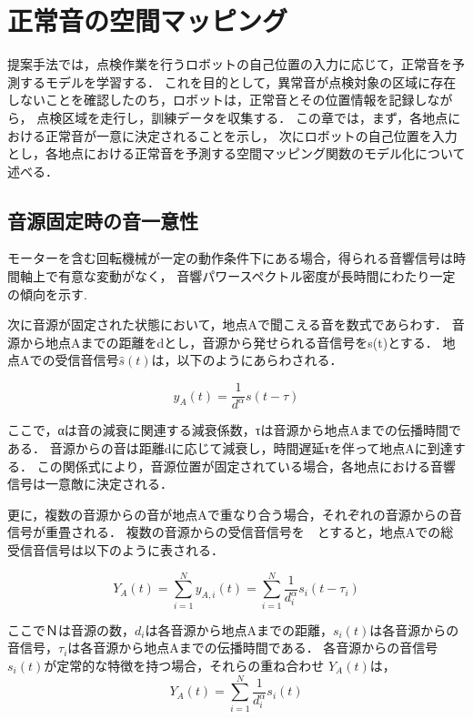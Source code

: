 \documentclass[../main]{subfiles}
\begin{document}
\section{正常音の空間マッピング}

提案手法では，点検作業を行うロボットの自己位置の入力に応じて，正常音を予測するモデルを学習する．
これを目的として，異常音が点検対象の区域に存在しないことを確認したのち，ロボットは，正常音とその位置情報を記録しながら，
点検区域を走行し，訓練データを収集する．
この章では，まず，各地点における正常音が一意に決定されることを示し，
次にロボットの自己位置を入力とし，各地点における正常音を予測する空間マッピング関数のモデル化について述べる．
\subsection{音源固定時の音一意性}

モーターを含む回転機械が一定の動作条件下にある場合，得られる音響信号は時間軸上で有意な変動がなく，
音響パワースペクトル密度が長時間にわたり一定の傾向を示す.\cite{beranek1992noise}

次に音源が固定された状態において，地点Aで聞こえる音を数式であらわす．
音源から地点Aまでの距離をdとし，音源から発せられる音信号をs(t)とする．
地点Aでの受信音信号\(\hat{s}(t)\)は，以下のようにあらわされる．

\begin{equation} y_A(t) = \frac{1}{d^\alpha} s(t - \tau) \end{equation}

ここで，αは音の減衰に関連する減衰係数，τは音源から地点Aまでの伝播時間である．
音源からの音は距離dに応じて減衰し，時間遅延τを伴って地点Aに到達する．
この関係式により，音源位置が固定されている場合，各地点における音響信号は一意敵に決定される．

更に，複数の音源からの音が地点Aで重なり合う場合，それぞれの音源からの音信号が重畳される．
複数の音源からの受信音信号を　とすると，地点Aでの総受信音信号は以下のように表される．

\begin{equation} Y_A(t) = \sum_{i=1}^{N} y_{A,i}(t) = \sum_{i=1}^{N} \frac{1}{d_i^\alpha} s_i(t - \tau_i) \end{equation}

ここでＮは音源の数，\(d_i\)は各音源から地点Aまでの距離，\(s_i(t)\)は各音源からの音信号，\(\tau_i\)は各音源から地点Aまでの伝播時間である．
各音源からの音信号　\(s_i(t)\)が定常的な特徴を持つ場合，それらの重ね合わせ
\(Y_A(t)\)は，
\begin{equation} Y_A(t) = \sum_{i=1}^{N} \frac{1}{d_i^\alpha} s_i(t) \end{equation}
\end{document}
